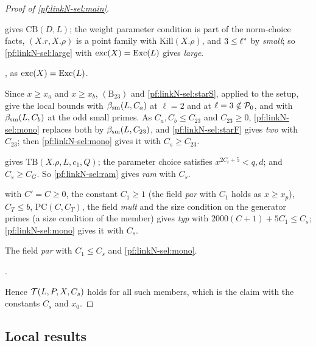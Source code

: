 \begin{proof}[Proof of \cref{pf:linkN-sel:main}]
\begin{description}[style=nextline,leftmargin=1.5em,font=\normalfont\itshape]
\item[large]  gives $\mathrm{CB}(D,L)$; the weight parameter condition is part of the norm-choice facts, $(X.r,X.\rho)$ is a
point family with $\mathrm{Kill}(X.\rho)$, and $3\le\ell^{*}$ by \emph{small}; so \cref{pf:linkN-sel:large} with $\mathrm{exc}(X)=\mathrm{Exc}(L)$
gives \emph{large}.
\item[exc] , as $\mathrm{exc}(X)=\mathrm{Exc}(L)$.
\item[two] Since $x\ge x_a$ and $x\ge x_b$, $(\mathrm B_{23})$ and \cref{pf:linkN-sel:starS}, applied to the setup, give the local bounds with
$\beta_{\mathrm{sm}}(L,C_a)$ at $\ell=2$ and at $\ell=3\notin\mathcal P_0$, and with $\beta_{\mathrm{sm}}(L,C_b)$ at the odd small primes. As $C_a,C_b\le C_{23}$ and
$C_{23}\ge0$, \cref{pf:linkN-sel:mono} replaces both by $\beta_{\mathrm{sm}}(L,C_{23})$, and \cref{pf:linkN-sel:starF} gives \emph{two} with $C_{23}$; then
\cref{pf:linkN-sel:mono} gives it with $C_s\ge C_{23}$.
\item[ram]  gives $\mathrm{TB}(X.\rho,L,c_1,Q)$; the parameter choice satisfies $x^{2C_t+5}<q,d$; and $C_s\ge C_G$. So
\cref{pf:linkN-sel:ram} gives \emph{ram} with $C_s$.
\item[typ]  with $C'=C\ge0$, the constant $C_1\ge1$ (the field \emph{par} with $C_1$ holds as $x\ge x_p$), $C_T\le b$,
$\mathrm{PC}(C,C_T)$, the field \emph{mult} and the size condition on the generator primes (a size condition of the member) gives \emph{typ} with
$2000(C+1)+5C_1\le C_s$; \cref{pf:linkN-sel:mono} gives it with $C_s$.
\item[par] The field \emph{par} with $C_1\le C_s$ and \cref{pf:linkN-sel:mono}.
\item[small] .
\end{description}
Hence $\mathcal T(L,P,X,C_s)$ holds for all such members, which is the claim with the constants $C_s$ and $x_0$.
\end{proof}

\subsection{Local results}\label{sec:pf:linkN-sel:local}

